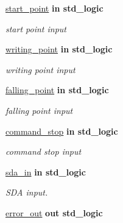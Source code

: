 \begin{DoxyCompactItemize}
\hyperlink{classstop__generator_a3d23bfd08667d8c545bdbd9bf1048041}{start\+\_\+point}  {\bfseries {\bfseries \textcolor{vhdlchar}{in}\textcolor{vhdlchar}{ }}} {\bfseries \textcolor{vhdlchar}{std\+\_\+logic}\textcolor{vhdlchar}{ }} 
\begin{DoxyCompactList}\small\item\em start point input \end{DoxyCompactList}\item 
\hyperlink{classstop__generator_a12d6c9c482b5975efc30e34bb0951659}{writing\+\_\+point}  {\bfseries {\bfseries \textcolor{vhdlchar}{in}\textcolor{vhdlchar}{ }}} {\bfseries \textcolor{vhdlchar}{std\+\_\+logic}\textcolor{vhdlchar}{ }} 
\begin{DoxyCompactList}\small\item\em writing point input \end{DoxyCompactList}\item 
\hyperlink{classstop__generator_ae13d7074835244efb7bd3538f42162b9}{falling\+\_\+point}  {\bfseries {\bfseries \textcolor{vhdlchar}{in}\textcolor{vhdlchar}{ }}} {\bfseries \textcolor{vhdlchar}{std\+\_\+logic}\textcolor{vhdlchar}{ }} 
\begin{DoxyCompactList}\small\item\em falling point input \end{DoxyCompactList}\item 
\hyperlink{classstop__generator_a94fb4efbf1505b8ef25cb3f1807ccf24}{command\+\_\+stop}  {\bfseries {\bfseries \textcolor{vhdlchar}{in}\textcolor{vhdlchar}{ }}} {\bfseries \textcolor{vhdlchar}{std\+\_\+logic}\textcolor{vhdlchar}{ }} 
\begin{DoxyCompactList}\small\item\em command stop input \end{DoxyCompactList}\item 
\hyperlink{classstop__generator_abee794776f0ccd767e459566850c3656}{sda\+\_\+in}  {\bfseries {\bfseries \textcolor{vhdlchar}{in}\textcolor{vhdlchar}{ }}} {\bfseries \textcolor{vhdlchar}{std\+\_\+logic}\textcolor{vhdlchar}{ }} 
\begin{DoxyCompactList}\small\item\em S\+DA input. \end{DoxyCompactList}\item 
\hyperlink{classstop__generator_a7d3323a10c64f9e722f7b8e5e5a7ad6a}{error\+\_\+out}  {\bfseries {\bfseries \textcolor{vhdlchar}{out}\textcolor{vhdlchar}{ }}} {\bfseries \textcolor{vhdlchar}{std\+\_\+logic}\textcolor{vhdlchar}{ }} 

\end{DoxyCompactItemize}
